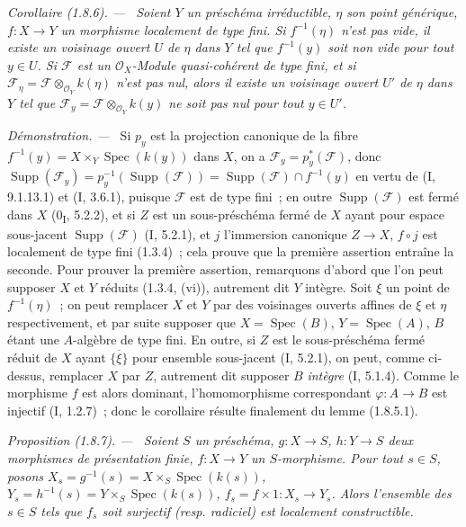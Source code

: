 \documentclass[10pt,oneside]{book}
\makeatletter
\newcommand{\setmanualcurrentlabel}[1]{\def\@currentlabel{#1}}
\newcommand{\oldpage}[2][]{%
  \setcounter{footnote}{0}%
  \marginpar{\scriptsize\textbf{#1}~|~#2}\ignorespaces}
\newenvironment{proposition}[1][]{%
  \setmanualcurrentlabel{#1}\par\medskip\noindent\itshape Proposition (#1). ---\ }{\par}
\newenvironment{corollary}[1][]{%
  \setmanualcurrentlabel{#1}\par\medskip\noindent\itshape Corollaire (#1). ---\ }{\par}
\newenvironment{proof}{%
  \par\medskip\noindent\textit{Démonstration. ---\ }}{\par}
\makeatother
\begin{document}
\begin{corollary}[1.8.6]
\label{IV.1.8.6-fr}
Soient $Y$ un préschéma irréductible, $\eta$ son point générique,
$f:X\to Y$ un morphisme localement de type fini. Si $f^{-1}(\eta)$ n'est pas
vide, il existe un voisinage ouvert $U$ de $\eta$ dans $Y$ tel que
$f^{-1}(y)$ soit non vide pour tout $y\in U$. Si $\mathscr F$ est un
$\mathcal O_X$-Module quasi-cohérent de type fini, et si
$\mathscr F_\eta=\mathscr F\otimes_{\mathcal O_Y}k(\eta)$ n'est pas nul,
alors il existe un voisinage ouvert $U'$ de $\eta$ dans $Y$ tel que
$\mathscr F_y=\mathscr F\otimes_{\mathcal O_Y}k(y)$ ne soit pas nul pour
tout $y\in U'$.
\end{corollary}

\begin{proof}
Si $p_y$ est la projection canonique de la fibre
$f^{-1}(y)=X\times_Y\operatorname{Spec}(k(y))$ dans $X$, on a
$\mathscr F_y=p_y^*(\mathscr F)$, donc
$\operatorname{Supp}(\mathscr F_y)=p_y^{-1}(\operatorname{Supp}(\mathscr F))
=\operatorname{Supp}(\mathscr F)\cap f^{-1}(y)$ en vertu de (I, 9.1.13.1) et
(I, 3.6.1), puisque $\mathscr F$ est de type fini~; en outre
$\operatorname{Supp}(\mathscr F)$ est fermé dans $X$ (0\textsubscript{I},
5.2.2), et si $Z$ est un sous-préschéma fermé de $X$ ayant pour espace
sous-jacent $\operatorname{Supp}(\mathscr F)$ (I, 5.2.1), et $j$ l'immersion
canonique $Z\to X$, $f\circ j$ est localement de type fini (1.3.4)~; cela
prouve que la première assertion entraîne la seconde. Pour prouver la
première assertion, remarquons d'abord que l'on peut supposer $X$ et $Y$
réduits (1.3.4, (vi)), autrement dit $Y$ intègre. Soit $\xi$ un point de
$f^{-1}(\eta)$~; on peut remplacer $X$ et $Y$ par des voisinages ouverts
affines de $\xi$ et $\eta$ respectivement, et par suite supposer que
$X=\operatorname{Spec}(B)$, $Y=\operatorname{Spec}(A)$, $B$ étant une
$A$-algèbre de type fini. En outre, si $Z$ est le sous-préschéma fermé réduit
de $X$ ayant $\overline{\{\xi\}}$ pour ensemble sous-jacent (I, 5.2.1), on
peut, comme ci-dessus, remplacer $X$ par $Z$, autrement dit supposer $B$
\emph{intègre} (I, 5.1.4). Comme le morphisme $f$ est alors dominant,
l'homomorphisme correspondant $\varphi:A\to B$ est injectif (I, 1.2.7)~;
donc le corollaire résulte finalement du lemme (1.8.5.1).
\end{proof}

\oldpage[IV-1]{241}

\begin{proposition}[1.8.7]
\label{IV.1.8.7-fr}
Soient $S$ un préschéma, $g:X\to S$, $h:Y\to S$ deux morphismes de
présentation finie, $f:X\to Y$ un $S$-morphisme. Pour tout $s\in S$, posons
$X_s=g^{-1}(s)=X\times_S\operatorname{Spec}(k(s))$,
$Y_s=h^{-1}(s)=Y\times_S\operatorname{Spec}(k(s))$,
$f_s=f\times 1:X_s\to Y_s$. Alors l'ensemble des $s\in S$ tels que $f_s$
soit surjectif (resp. radiciel) est localement constructible.
\end{proposition}
\end{document}
